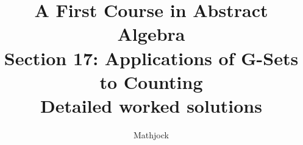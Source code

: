 
\title{\textbf{A First Course in Abstract Algebra}\\[0.3em]Section 17: Applications of G-Sets to Counting\\[0.3em]\large Detailed worked solutions}
\author{Mathjock}
\date{}

\maketitle
\bookinfo
\tableofcontents
\clearpage
\renewcommand{\thesection}{17}
\renewcommand{\theHsection}{fraleigh.17}


